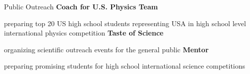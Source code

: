 \begin{rubric}{Public Outreach}
%
\entry*[\hspace{1.7cm} ]%
  \textbf{Coach for U.S. Physics Team}
  \par preparing top 20 US high school students representing USA in high school level international physics competition
%
\entry*[\hfill]%
  \textbf{Taste of Science} 
  \par organizing scientific outreach events
for the general public
%
\entry*[\hfill]%
  \textbf{Mentor}
  \par preparing promising students for high school international science competitions 
\end{rubric}
